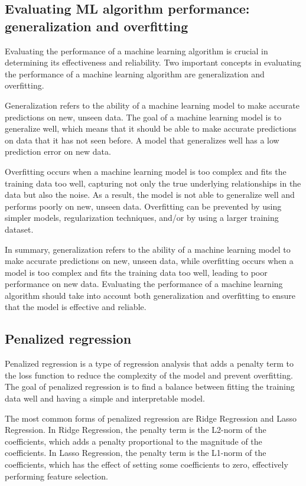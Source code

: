 \documentclass[12pt, a4paper, oneside]{article}
\begin{document}
\subsection{ Evaluating ML algorithm performance: generalization and overfitting }
Evaluating the performance of a machine learning algorithm is crucial in determining its effectiveness and reliability. Two important concepts in evaluating the performance of a machine learning algorithm are generalization and overfitting.

Generalization refers to the ability of a machine learning model to make accurate predictions on new, unseen data. The goal of a machine learning model is to generalize well, which means that it should be able to make accurate predictions on data that it has not seen before. A model that generalizes well has a low prediction error on new data.

Overfitting occurs when a machine learning model is too complex and fits the training data too well, capturing not only the true underlying relationships in the data but also the noise. As a result, the model is not able to generalize well and performs poorly on new, unseen data. Overfitting can be prevented by using simpler models, regularization techniques, and/or by using a larger training dataset.

In summary, generalization refers to the ability of a machine learning model to make accurate predictions on new, unseen data, while overfitting occurs when a model is too complex and fits the training data too well, leading to poor performance on new data. Evaluating the performance of a machine learning algorithm should take into account both generalization and overfitting to ensure that the model is effective and reliable.
\subsection{ Penalized regression }
Penalized regression is a type of regression analysis that adds a penalty term to the loss function to reduce the complexity of the model and prevent overfitting. The goal of penalized regression is to find a balance between fitting the training data well and having a simple and interpretable model.

The most common forms of penalized regression are Ridge Regression and Lasso Regression. In Ridge Regression, the penalty term is the L2-norm of the coefficients, which adds a penalty proportional to the magnitude of the coefficients. In Lasso Regression, the penalty term is the L1-norm of the coefficients, which has the effect of setting some coefficients to zero, effectively performing feature selection.
\end{document}
